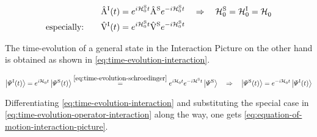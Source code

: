 \begin{equation}
    \label{eq:time-evolution-operator-interaction}
    \begin{split}
        \AopOfT[\interactionPicture] &= e^{i \HzeroHamiltonian[\schroedingerPicture]{} t} \Aop[\schroedingerPicture] e^{-i \HzeroHamiltonian[\schroedingerPicture]{} t}
        \quad \Rightarrow \quad 
        \HzeroHamiltonian[\schroedingerPicture]{} = \HzeroHamiltonian[\interactionPicture]{}= \HzeroHamiltonian[]{}\\
        \text{especially:} \qquad \VhamiltonianOfT[\interactionPicture] &=  e^{i \HzeroHamiltonian[\schroedingerPicture]{} t} \Vhamiltonian[\schroedingerPicture] e^{-i \HzeroHamiltonian[\schroedingerPicture]{} t}
    \end{split}
\end{equation}

The time-evolution of a general state in the Interaction Picture on the other hand is obtained as shown in \autoref{eq:time-evolution-interaction}.

\begin{equation}
    \label{eq:time-evolution-interaction}
    \ketpsiof[\interactionPicture]{t} = e^{i \HzeroHamiltonian{} t} \ketpsiof[\schroedingerPicture]{t} \stackrel{\ref{eq:time-evolution-schroedinger}}{=} e^{i \HzeroHamiltonian{} t} e^{-i \pictureHamiltonian[\schroedingerPicture]{} t} \ketpsi[\schroedingerPicture]{} 
    \quad \Rightarrow \quad 
    \ketpsiof[\schroedingerPicture]{t} = e^{-i \HzeroHamiltonian{} t} \ketpsiof[\interactionPicture]{t}
\end{equation}

Differentiating \autoref{eq:time-evolution-interaction} and substituting the special case in \autoref{eq:time-evolution-operator-interaction} along the way, one gets \autoref{eq:equation-of-motion-interaction-picture}.

